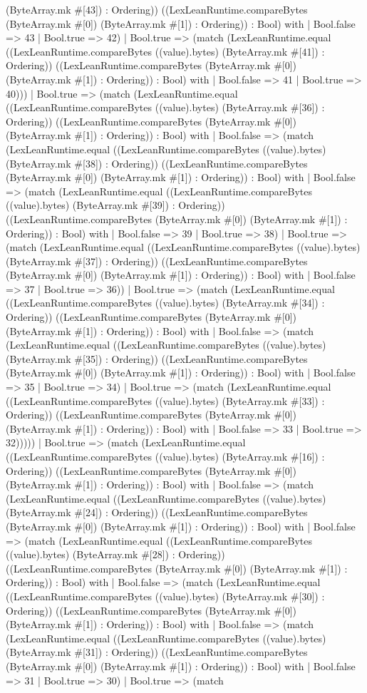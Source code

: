 \documentclass[11pt]{article}
\begin{document}
(ByteArray.mk \#[43]) : Ordering)) ((LexLeanRuntime.compareBytes (ByteArray.mk \#[0]) (ByteArray.mk \#[1]) : Ordering)) : Bool) with | Bool.false => 43 | Bool.true => 42) | Bool.true => (match (LexLeanRuntime.equal ((LexLeanRuntime.compareBytes ((value).bytes) (ByteArray.mk \#[41]) : Ordering)) ((LexLeanRuntime.compareBytes (ByteArray.mk \#[0]) (ByteArray.mk \#[1]) : Ordering)) : Bool) with | Bool.false => 41 | Bool.true => 40))) | Bool.true => (match (LexLeanRuntime.equal ((LexLeanRuntime.compareBytes ((value).bytes) (ByteArray.mk \#[36]) : Ordering)) ((LexLeanRuntime.compareBytes (ByteArray.mk \#[0]) (ByteArray.mk \#[1]) : Ordering)) : Bool) with | Bool.false => (match (LexLeanRuntime.equal ((LexLeanRuntime.compareBytes ((value).bytes) (ByteArray.mk \#[38]) : Ordering)) ((LexLeanRuntime.compareBytes (ByteArray.mk \#[0]) (ByteArray.mk \#[1]) : Ordering)) : Bool) with | Bool.false => (match (LexLeanRuntime.equal ((LexLeanRuntime.compareBytes ((value).bytes) (ByteArray.mk \#[39]) : Ordering)) ((LexLeanRuntime.compareBytes (ByteArray.mk \#[0]) (ByteArray.mk \#[1]) : Ordering)) : Bool) with | Bool.false => 39 | Bool.true => 38) | Bool.true => (match (LexLeanRuntime.equal ((LexLeanRuntime.compareBytes ((value).bytes) (ByteArray.mk \#[37]) : Ordering)) ((LexLeanRuntime.compareBytes (ByteArray.mk \#[0]) (ByteArray.mk \#[1]) : Ordering)) : Bool) with | Bool.false => 37 | Bool.true => 36)) | Bool.true => (match (LexLeanRuntime.equal ((LexLeanRuntime.compareBytes ((value).bytes) (ByteArray.mk \#[34]) : Ordering)) ((LexLeanRuntime.compareBytes (ByteArray.mk \#[0]) (ByteArray.mk \#[1]) : Ordering)) : Bool) with | Bool.false => (match (LexLeanRuntime.equal ((LexLeanRuntime.compareBytes ((value).bytes) (ByteArray.mk \#[35]) : Ordering)) ((LexLeanRuntime.compareBytes (ByteArray.mk \#[0]) (ByteArray.mk \#[1]) : Ordering)) : Bool) with | Bool.false => 35 | Bool.true => 34) | Bool.true => (match (LexLeanRuntime.equal ((LexLeanRuntime.compareBytes ((value).bytes) (ByteArray.mk \#[33]) : Ordering)) ((LexLeanRuntime.compareBytes (ByteArray.mk \#[0]) (ByteArray.mk \#[1]) : Ordering)) : Bool) with | Bool.false => 33 | Bool.true => 32))))) | Bool.true => (match (LexLeanRuntime.equal ((LexLeanRuntime.compareBytes ((value).bytes) (ByteArray.mk \#[16]) : Ordering)) ((LexLeanRuntime.compareBytes (ByteArray.mk \#[0]) (ByteArray.mk \#[1]) : Ordering)) : Bool) with | Bool.false => (match (LexLeanRuntime.equal ((LexLeanRuntime.compareBytes ((value).bytes) (ByteArray.mk \#[24]) : Ordering)) ((LexLeanRuntime.compareBytes (ByteArray.mk \#[0]) (ByteArray.mk \#[1]) : Ordering)) : Bool) with | Bool.false => (match (LexLeanRuntime.equal ((LexLeanRuntime.compareBytes ((value).bytes) (ByteArray.mk \#[28]) : Ordering)) ((LexLeanRuntime.compareBytes (ByteArray.mk \#[0]) (ByteArray.mk \#[1]) : Ordering)) : Bool) with | Bool.false => (match (LexLeanRuntime.equal ((LexLeanRuntime.compareBytes ((value).bytes) (ByteArray.mk \#[30]) : Ordering)) ((LexLeanRuntime.compareBytes (ByteArray.mk \#[0]) (ByteArray.mk \#[1]) : Ordering)) : Bool) with | Bool.false => (match (LexLeanRuntime.equal ((LexLeanRuntime.compareBytes ((value).bytes) (ByteArray.mk \#[31]) : Ordering)) ((LexLeanRuntime.compareBytes (ByteArray.mk \#[0]) (ByteArray.mk \#[1]) : Ordering)) : Bool) with | Bool.false => 31 | Bool.true => 30) | Bool.true => (match 
\end{document}
